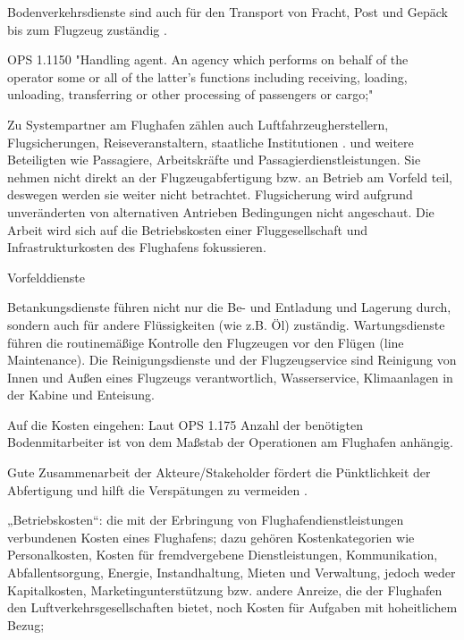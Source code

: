 Bodenverkehrsdienste sind auch für den Transport von Fracht, Post und Gepäck bis zum Flugzeug zuständig \cite{mensen2013handbuch}.

OPS 1.1150 "Handling agent. An agency which performs on behalf of the operator some or all of the latter's functions
including receiving, loading, unloading, transferring or other processing of passengers or cargo;"


Zu Systempartner am Flughafen zählen auch Luftfahrzeugherstellern, Flugsicherungen, Reiseveranstaltern, staatliche Institutionen \cite{maertens2023neue}. 
und weitere Beteiligten wie Passagiere, Arbeitskräfte und Passagierdienstleistungen. 
Sie nehmen nicht direkt an der Flugzeugabfertigung bzw. an Betrieb am Vorfeld teil, deswegen werden sie weiter nicht betrachtet.
Flugsicherung wird aufgrund unveränderten von alternativen Antrieben Bedingungen nicht angeschaut. 
Die Arbeit wird sich auf die Betriebskosten einer Fluggesellschaft und Infrastrukturkosten des Flughafens fokussieren.


Vorfelddienste

Betankungsdienste führen nicht nur die Be- und Entladung und Lagerung durch, sondern auch für andere Flüssigkeiten (wie z.B. Öl) zuständig.
Wartungsdienste führen die routinemäßige Kontrolle den Flugzeugen vor den Flügen (line Maintenance).
Die Reinigungsdienste und der Flugzeugservice sind Reinigung von Innen und Außen eines Flugzeugs verantwortlich, Wasserservice, 
Klimaanlagen in der Kabine und Enteisung.


Auf die Kosten eingehen:
Laut OPS 1.175 %
Anzahl der benötigten Bodenmitarbeiter ist von dem Maßstab der Operationen am Flughafen anhängig.


Gute Zusammenarbeit der Akteure/Stakeholder fördert die Pünktlichkeit der Abfertigung und hilft die 
Verspätungen zu vermeiden \cite{schmidt2016challenges}.

 
%
%
„Betriebskosten“: die mit der Erbringung von Flughafendienstleistungen verbundenen Kosten eines Flughafens;
 dazu gehören Kostenkategorien wie Personalkosten, Kosten für fremdvergebene Dienstleistungen, Kommunikation, 
 Abfallentsorgung, Energie, Instandhaltung, Mieten und Verwaltung, jedoch weder Kapitalkosten, Marketingunterstützung 
 bzw. andere Anreize, die der Flughafen den Luftverkehrsgesellschaften bietet, noch Kosten für Aufgaben mit hoheitlichem Bezug;

